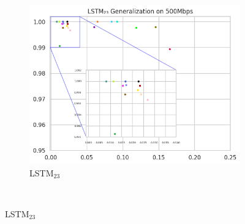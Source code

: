 \documentclass[a4paper,fleqn]{cas-sc}
\begin{document}
\begin{figure}[h!]
\begin{minipage}[t]{0.46\textwidth}
\begin{subfigure}[t]{0.33\textwidth}
			\includegraphics[draft=false, width=\textwidth]{./figs/Generalizacao-LSTM23-500Mbps.png} 
			\caption{LSTM$_{23}$}
			\label{fig:Generalizacao-LSTM23-500Mbps}
		\end{subfigure}%
		~%
		

\end{minipage}
\end{figure}
\end{document}
